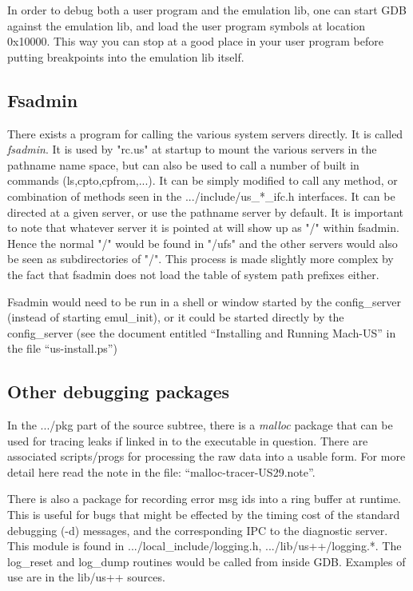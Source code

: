 In order to debug both a user program and the emulation lib, one can start
GDB against the emulation lib, and load the user program symbols at location
0x10000.  This way you can stop at a good place in your user program before
putting breakpoints into the emulation lib itself.

\subsection{Fsadmin}
There exists a program for calling the various system servers directly.
It is called {\em fsadmin}.  It is used by "rc.us" at startup to mount
the various servers in the pathname name space, but can also be used to
call a number of built in commands (ls,cpto,cpfrom,...).  It can be simply
modified to call any method, or combination of methods seen in 
the .../include/us\_*\_ifc.h interfaces.  It can be directed at a given server,
or use the pathname server by default.  It is important to note that
whatever server it is pointed at will show up as "/" within fsadmin.
Hence the normal "/" would be found in "/ufs" and the other servers would
also be seen as subdirectories of "/".  This process is made slightly
more complex by the fact that fsadmin does not load the table of system
path prefixes either.

Fsadmin would need to be run in a shell or window started by
the config\_server (instead of starting emul\_init), or it could be started
directly by the config\_server (see the document
entitled ``Installing and Running Mach-US''
in the file ``us-install.ps'')


\subsection{Other debugging packages}
In the .../pkg part of the source subtree, there is a {\em malloc} package
that can be used for tracing leaks if linked in to the executable in question.
There are associated scripts/progs for processing the raw data into a usable
form. For more detail here read the note in the file:
``malloc-tracer-US29.note''.

There is also a package for recording error msg ids into a ring buffer
at runtime.  This is useful for bugs that might be effected by the
timing cost of the standard debugging (-d) messages, and the corresponding
IPC to the diagnostic server.  This module is found in .../local\_include/logging.h, .../lib/us++/logging.*.  The log\_reset and log\_dump routines would
be called from inside GDB.  Examples of use are in the lib/us++ sources.


